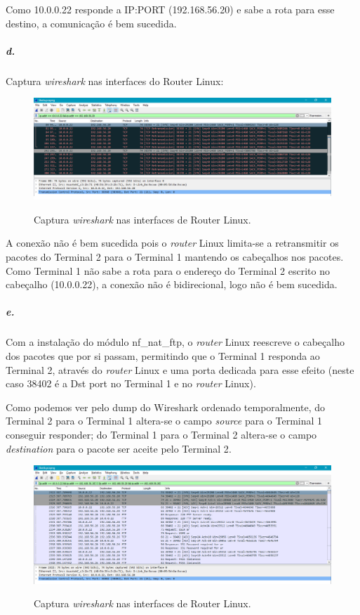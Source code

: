 Como \textsf{10.0.0.22} responde a \textsf{IP:PORT} (\textsf{192.168.56.20}) 
e sabe a rota para esse destino, a comunicação é bem sucedida.


\subparagraph{d.}
Captura \emph{wireshark} nas interfaces do \textsf{Router Linux}:

\begin{figure}[h]
\centering
\includegraphics[width=1\textwidth, height=0.3\textheight]{5d.png}
\label{fig:5d}
\caption{Captura \emph{wireshark} nas interfaces de \textsf{Router Linux}.}
\end{figure}

A conexão não é bem sucedida pois o \textsf{\emph{router} Linux} limita-se 
a retransmitir os pacotes do \textsf{Terminal 2} para o \textsf{Terminal 1} 
mantendo os cabeçalhos nos pacotes. Como \textsf{Terminal 1} não sabe a rota 
para o endereço do \textsf{Terminal 2} escrito no cabeçalho (\textsf{10.0.0.22}), 
a conexão não é bidirecional, logo não é bem sucedida.


\subparagraph{e.}
Com a instalação do módulo \textsf{nf\_nat\_ftp}, o \textsf{\emph{router} Linux}
reescreve o cabeçalho dos pacotes que por si passam, permitindo que o
\textsf{Terminal 1} responda ao \textsf{Terminal 2}, através do 
\textsf{\emph{router} Linux} e uma porta dedicada para esse efeito 
(neste caso \textsf{38402} é a \textsf{Dst port} no \textsf{Terminal 1} e
no \textsf{\emph{router} Linux}).

Como podemos ver pelo dump do Wireshark ordenado temporalmente, do 
\textsf{Terminal 2} para o \textsf{Terminal 1} altera-se o campo 
\emph{source} para o \textsf{Terminal 1} conseguir responder; do 
\textsf{Terminal 1} para o \textsf{Terminal 2} altera-se o campo 
\emph{destination} para o pacote ser aceite pelo \textsf{Terminal 2}.

\newpage

\begin{figure}[h]
\centering
\includegraphics[width=1\textwidth, height=0.3\textheight]{5e.png}
\label{fig:5e}
\caption{Captura \emph{wireshark} nas interfaces de \textsf{Router Linux}.}
\end{figure}
